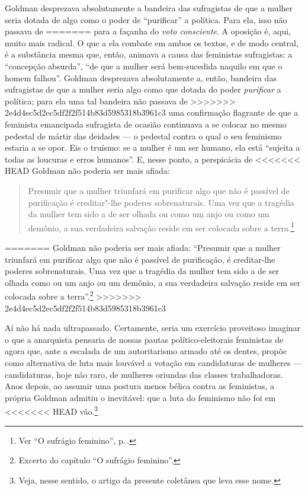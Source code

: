 Goldman desprezava absolutamente a
bandeira das sufragistas de que a mulher seria dotada de algo como o
poder de ``purificar'' a política. Para ela, isso não passava de
=======
para a façanha do \textit{voto consciente}. A oposição é, aqui, muito mais
radical. O que a ela combate em ambos os textos, e de modo central, é a
substância mesma que, então, animava a causa das feministas sufragistas:
a ``concepção absurda'', ``de que a mulher será bem-sucedida naquilo em
que o homem falhou''. Goldman desprezava absolutamente a, então,
bandeira das sufragistas de que a mulher seria algo como que dotada do
poder \textit{purificar} a política; para ela uma tal bandeira não passava de
>>>>>>> 2e4d4ec5d2ec5df2f2f514b83d5985318b3961c3
uma confirmação flagrante de que a feminista emancipada sufragista de
ocasião continuava a se colocar no mesmo pedestal de mártir das deidades
--- o pedestal contra o qual o seu feminismo estaria a se
opor. Eis o truísmo: se a mulher é um ser humano, ela está ``sujeita a
todas as loucuras e erros humanos''. E, nesse ponto, a perspicácia de
<<<<<<< HEAD
Goldman não poderia ser mais afiada:

\begin{quote}
Presumir que a mulher triunfará em
purificar algo que não é passível de purificação é creditar"-lhe poderes
sobrenaturais. Uma vez que a tragédia da mulher tem sido a de ser olhada
ou como um anjo ou como um demônio, a sua verdadeira salvação reside em ser
colocada sobre a terra.\footnote{Ver ``O sufrágio feminino'', p.\,\pageref{purificar}.}
\end{quote}
=======
Goldman não poderia ser mais afiada: ``Presumir que a mulher triunfará
em purificar algo que não é passível de purificação, é creditar-lhe
poderes sobrenaturais. Uma vez que a tragédia da mulher tem sido a de
ser olhada como ou um anjo ou um demônio, a sua verdadeira salvação
reside em ser colocada sobre a terra''.\footnote{Excerto do capítulo ``O sufrágio feminino''.}
>>>>>>> 2e4d4ec5d2ec5df2f2f514b83d5985318b3961c3

Aí não há nada ultrapassado. Certamente, seria um exercício proveitoso
imaginar o que a anarquista pensaria de nossas pautas
político-eleitorais feministas de agora que, ante a escalada de um
autoritarismo armado até os dentes, propõe como alternativa de luta mais
louvável a votação em candidaturas de mulheres --- candidaturas,
hoje não raro, de mulheres oriundas das classes trabalhadoras.
Anos depois, ao assumir uma postura menos bélica contra as feministas, a
própria Goldman admitiu o inevitável: que a luta do feminismo não foi em
<<<<<<< HEAD
vão.\footnote{Veja, nesse sentido, o artigo da presente coletânea que leva esse
nome.}

